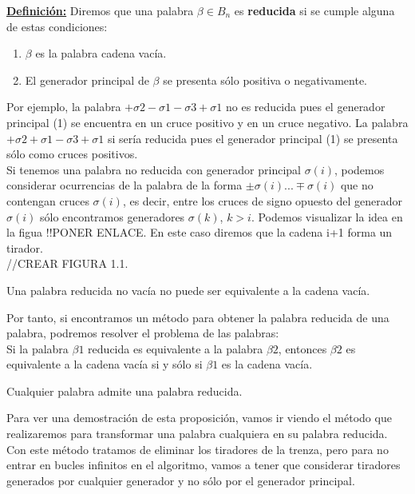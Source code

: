 \documentclass[14pt]{extarticle}
\begin{document}
\textbf{\underline{Definición:}}
Diremos que una palabra $\beta \in B_{n}$ es \textbf{reducida} si se cumple alguna de estas condiciones:
\begin{enumerate}
	\item $\beta$ es la palabra cadena vacía.
	\item El generador principal de $\beta$ se presenta sólo positiva o negativamente. 
\end{enumerate}
 
Por ejemplo, la palabra $+\sigma2-\sigma1-\sigma3+\sigma1$ no es reducida pues el generador principal (1) se encuentra en un cruce positivo y en un cruce negativo. La palabra $+\sigma2+\sigma1-\sigma3+\sigma1$ si sería reducida pues el generador principal (1) se presenta sólo como cruces positivos.\\

Si tenemos una palabra no reducida con generador principal $ \sigma(i) $, podemos considerar ocurrencias de la palabra de la forma $ \pm \sigma(i) ... \mp \sigma(i) $ que no contengan cruces $ \sigma(i) $, es decir, entre los cruces de signo opuesto del generador $ \sigma(i) $ sólo encontramos generadores $ \sigma(k) $, $ k>i $. Podemos visualizar la idea en la figua !!PONER ENLACE. En este caso diremos que la cadena i+1 forma un tirador.\\
//CREAR FIGURA 1.1.

\begin{pro}
	Una palabra reducida no vacía no puede ser equivalente a la cadena vacía.
\end{pro}

Por tanto, si encontramos un método para obtener la palabra reducida de una palabra, podremos resolver el problema de las palabras: \\
Si la palabra $\beta1$ reducida es equivalente a la palabra $\beta2$, entonces $\beta2$ es equivalente a la cadena vacía si y sólo si $\beta1$ es la cadena vacía. \\

\begin{pro}
	Cualquier palabra admite una palabra reducida. 
\end{pro}

Para ver una demostración de esta proposición, vamos ir viendo el método que realizaremos para transformar una palabra cualquiera en su palabra reducida.\\ 
Con este método tratamos de eliminar los tiradores de la trenza, pero para no entrar en bucles infinitos en el algoritmo, vamos a tener que considerar tiradores generados por cualquier generador y no sólo por el generador principal.\\
\end{document}
